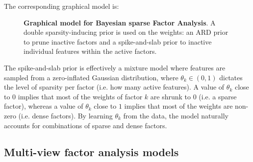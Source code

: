 The corresponding graphical model is:

\begin{figure}[H] \begin{center}
	
	\label{fig:bayesianFA}
	\caption{\textbf{Graphical model for Bayesian sparse Factor Analysis}. A double sparsity-inducing prior is used on the weights: an ARD prior to prune inactive factors and a spike-and-slab prior to inactive individual features within the active factors.}
\end{center} \end{figure}

The spike-and-slab prior is effectively a mixture model where features are sampled from a zero-inflated Gaussian distribution, where $\theta_k \in (0,1)$ dictates the level of sparsity per factor (i.e. how many active features). A value of $\theta_k$ close to $0$ implies that most of the weights of factor $k$ are shrunk to $0$ (i.e. a sparse factor), whereas a value of $\theta_k$ close to $1$ implies that most of the weights are non-zero (i.e. dense factors). By learning $\theta_k$ from the data, the model naturally accounts for combinations of sparse and dense factors.


\subsection{Multi-view factor analysis models}

